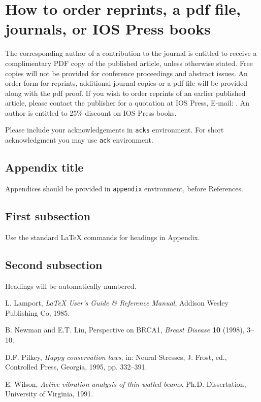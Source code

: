 \documentclass[jhs]{iosart2x}
\begin{document}
\section{How to order reprints, a pdf file, journals, or IOS Press
books}
The corresponding author of a contribution to the journal is entitled to receive a complimentary PDF copy of the published article, unless otherwise stated.
Free copies will not be provided for conference proceedings and abstract issues. An order form for reprints,
additional journal copies or a pdf file will be provided along with the pdf proof.
If you wish to order reprints of an earlier published article, please contact the publisher for a quotation at IOS Press, E-mail: .
An author is entitled to 25\% discount on IOS Press books.


\begin{acks}
Please include your acknowledgements in \verb|acks| environment. For short acknowledgment you may use \verb|ack| environment.
\end{acks}

\begin{appendix}
\section{Appendix title}
Appendices should be provided in \verb|appendix| environment, before References.

\subsection{First subsection}
Use the standard \LaTeX{} commands for headings in Appendix.

\subsection{Second subsection}
Headings will be automatically numbered. 
\end{appendix}


\begin{thebibliography}{0}

 L. Lamport, \textit{\LaTeX{} User's Guide \& Reference Manual},
 Addison Wesley Publishing Co, 1985.

 B. Newman and E.T. Liu, Perspective on BRCA1, \textit{Breast Disease} \textbf{10} (1998), 3--10. 

 D.F. Pilkey, \textit{Happy conservation laws}, in: Neural Stresses, J. Frost, ed., Controlled Press, Georgia, 1995, pp. 332--391.

 E. Wilson, \textit{Active vibration analysis of thin-walled beams}, Ph.D. Dissertation, University of Virginia, 1991.

\end{thebibliography}
\end{document}
